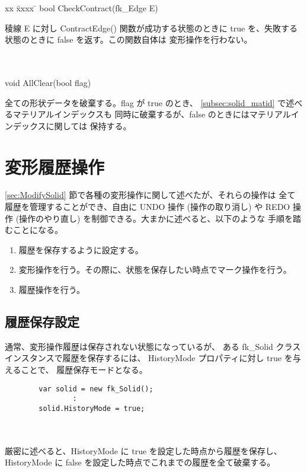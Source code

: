 \begin{tabbing}
xx \= xxxx \= \kill
 \> bool CheckContract(fk\_Edge E) \\
	\> \> \begin{minipage}[]{15cm}
		稜線 E に対し ContractEdge() 関数が成功する状態のときに
		true を、失敗する状態のときに false を返す。この関数自体は
		変形操作を行わない。
	\end{minipage} \\ \\

\> void AllClear(bool flag) \\
	\> \> \begin{minipage}[]{15cm}
		全ての形状データを破棄する。flag が true のとき、
		\ref{subsec:solid_matid} で述べるマテリアルインデックスも
		同時に破棄するが、false のときにはマテリアルインデックスに関しては
		保持する。
	\end{minipage}
\end{tabbing}
	
\section{変形履歴操作}
\ref{sec:ModifySolid} 節で各種の変形操作に関して述べたが、それらの操作は
全て履歴を管理することができ、自由に UNDO 操作 (操作の取り消し) や
REDO 操作 (操作のやり直し) を制御できる。大まかに述べると、以下のような
手順を踏むことになる。
\begin{enumerate}
 \item 履歴を保存するように設定する。
 \item 変形操作を行う。その際に、状態を保存したい時点でマーク操作を行う。
 \item 履歴操作を行う。
\end{enumerate}

\subsection{履歴保存設定} \label{subsec:shapehistory}
通常、変形操作履歴は保存されない状態になっているが、
ある fk\_Solid クラスインスタンスで履歴を保存するには、
HistoryMode プロパティに対し true を与えることで、
履歴保存モードとなる。\\
\begin{screen}
\begin{verbatim}
        var solid = new fk_Solid();
                :
        solid.HistoryMode = true;
\end{verbatim}
\end{screen} \\ ~ \\
厳密に述べると、HistoryMode に true を設定した時点から履歴を保存し、
HistoryMode に false を設定した時点でこれまでの履歴を全て破棄する。

